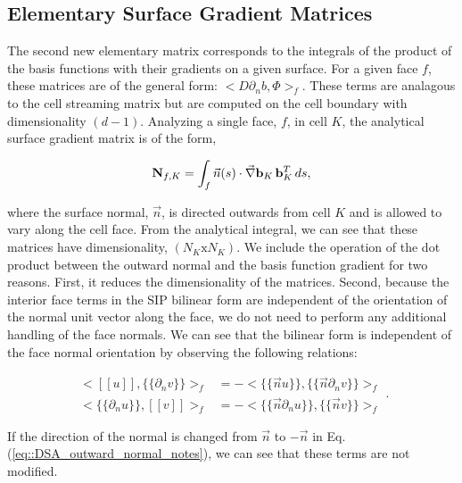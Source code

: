 \subsection{Elementary Surface Gradient Matrices}
\label{sec::DSA_SIP_SurfaceGradient}

The second new elementary matrix corresponds to the integrals of the product of the basis functions with their gradients on a given surface. For a given face $f$, these matrices are of the general form: $\Big<  D \partial_n b, \Phi \Big>_f$. These terms are analagous to the cell streaming matrix but are computed on the cell boundary with dimensionality $(d-1)$. Analyzing a single face, $f$, in cell $K$, the analytical surface gradient matrix is of the form,

\begin{equation}
\label{eq::DSA_surface_gradient_matrix_analytical}
{\bf N}_{f,K}  =    \int_f \vec{n} (s) \cdot \vec{\nabla} {\bf b}_K \, {\bf b}_K^T \, d s ,
\end{equation}

\noindent where the surface normal, $\vec{n}$, is directed outwards from cell $K$ and is allowed to vary along the cell face. From the analytical integral, we can see that these matrices have dimensionality, $(N_K \text{x} N_K )$. We include the operation of the dot product between the outward normal and the basis function gradient for two reasons. First, it reduces the dimensionality of the matrices. Second, because the interior face terms in the SIP bilinear form are independent of the orientation of the normal unit vector along the face, we do not need to perform any additional handling of the face normals. We can see that the bilinear form is independent of the face normal orientation by observing the following relations:

\begin{equation}
\label{eq::DSA_outward_normal_notes}
\begin{aligned}
\Big<  [\![   u ]\!] , \{\!\{   \partial_n v \}\!\}\Big>_{f}  &= - \Big<  \{\!\{ \vec{n}  u \}\!\} , \{\!\{  \vec{n} \partial_n v \}\!\}\Big>_{f} \\
\Big< \{\!\{   \partial_n u \}\!\} ,  [\![   v ]\!]\Big>_{f} &= - \Big<  \{\!\{ \vec{n} \partial_n  u \}\!\} , \{\!\{  \vec{n} v \}\!\}\Big>_{f}
\end{aligned}.
\end{equation}

\noindent If the direction of the normal is changed from $\vec{n}$ to $-\vec{n}$ in Eq. (\ref{eq::DSA_outward_normal_notes}), we can see that these terms are not modified. 

